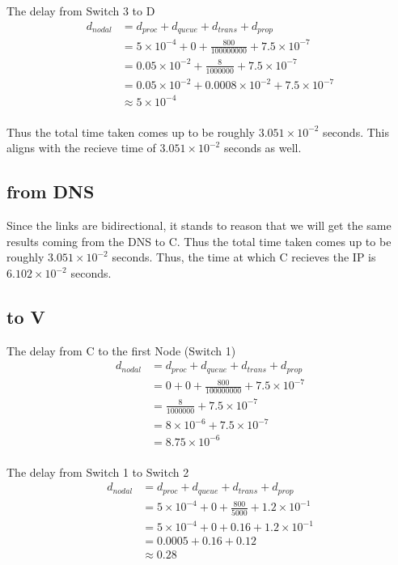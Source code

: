\documentclass{article}
\begin{document}
The delay from Switch 3 to D
\begin{align*}
    d_{nodal} &= d_{proc} + d_{queue} + d_{trans} + d_{prop} \\
    &= 5 \times 10^{-4} + 0 + \frac{800}{100000000} + 7.5 \times 10^{-7} \\
    &= 0.05 \times 10^{-2} + \frac{8}{1000000} + 7.5 \times 10^{-7} \\
    &= 0.05 \times 10^{-2} + 0.0008 \times 10^{-2} + 7.5 \times 10^{-7} \\
    &\approx 5 \times 10^{-4} \\
\end{align*}

Thus the total time taken comes up to be roughly $3.051 \times 10^{-2}$ seconds.
This aligns with the recieve time of $3.051 \times 10^{-2}$ seconds as well.

\subsection{from DNS}
Since the links are bidirectional, it stands to reason that we will get the
same results coming from the DNS to C.
Thus the total time taken comes up to be roughly $3.051 \times 10^{-2}$ seconds.
Thus, the time at which C recieves the IP is $6.102 \times 10^{-2}$ seconds.

\subsection{to V}
The delay from C to the first Node (Switch 1)
\begin{align*}
    d_{nodal} &= d_{proc} + d_{queue} + d_{trans} + d_{prop} \\
    &= 0 + 0 + \frac{800}{100000000} + 7.5 \times 10^{-7} \\
    &= \frac{8}{1000000} + 7.5 \times 10^{-7} \\
    &= 8 \times 10^{-6} + 7.5 \times 10^{-7} \\
    &= 8.75 \times 10^{-6} \\
\end{align*}

The delay from Switch 1 to Switch 2
\begin{align*}
    d_{nodal} &= d_{proc} + d_{queue} + d_{trans} + d_{prop} \\
    &= 5 \times 10^{-4} + 0 + \frac{800}{5000} + 1.2 \times 10^{-1} \\
    &= 5 \times 10^{-4} + 0 + 0.16 + 1.2 \times 10^{-1} \\
    &= 0.0005 + 0.16 + 0.12 \\
    &\approx 0.28 \\
\end{align*}
\end{document}
